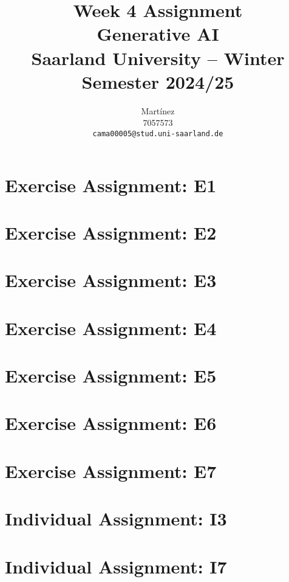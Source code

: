 \documentclass{article}
\title{Week 4 Assignment\\
\vspace{2mm}
\small{Generative AI}
\\
\vspace{2mm}
\small{Saarland University -- Winter Semester 2024/25}
}
\author{%
  Martínez \\
  7057573 \\
  \texttt{cama00005@stud.uni-saarland.de} \\
}
\begin{document}
\DeclareRobustCommand{\textitbf}[1]{\textbf{\textit{#1}}} %

\maketitle

\section{Exercise Assignment: E1}\label{sec:e1}

\section{Exercise Assignment: E2}\label{sec:e2}

\section{Exercise Assignment: E3}\label{sec:e3}

\section{Exercise Assignment: E4}\label{sec:e4}

\section{Exercise Assignment: E5}\label{sec:e5}

\section{Exercise Assignment: E6}\label{sec:e6}

\section{Exercise Assignment: E7}\label{sec:e7}

\section{Individual Assignment: I3}\label{sec:i3}

\section{Individual Assignment: I7}\label{sec:i7}
\end{document}
